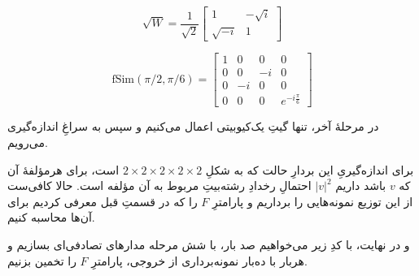 \documentclass[11pt]{article}
\begin{document}
\[ \sqrt{W} = \frac{1}{\sqrt{2}} \begin{bmatrix} 1 & - \sqrt{i} \\ \sqrt{-i} & 1 \end{bmatrix} \]

\[ \text{fSim}(\pi/2, \pi/6) = \begin{bmatrix} 
1 & 0 & 0 & 0 \\
0 & 0 & -i & 0 \\
0 & -i & 0 & 0 \\
0 & 0 & 0 & e^{-i\frac{\pi}{6}} \end{bmatrix} \]

در مرحلهٔ آخر، تنها گیتِ یک‌کیوبیتی اعمال می‌کنیم و سپس به سراغِ اندازه‌گیری می‌رویم.

برای اندازه‌گیریِ این بردارِ حالت که به شکلِ 
$2\times 2\times 2\times 2\times 2$
است، برای هرمؤلفهٔ آن که $v$ باشد داریم 
$|v|^2$
احتمالِ رخدادِ رشته‌بیتِ مربوط به آن مؤلفه است. حالا کافی‌ست از این توزیع نمونه‌هایی را برداریم و پارامترِ $F$ را که در قسمتِ قبل معرفی کردیم برای آن‌ها محاسبه کنیم.

و در نهایت، با کدِ زیر می‌خواهیم صد بار،  با شش مرحله مدارهای تصادفی‌ای بسازیم و هربار با ده‌بار نمونه‌برداری از خروجی، پارامترِ $F$ را تخمین بزنیم.
\end{document}
